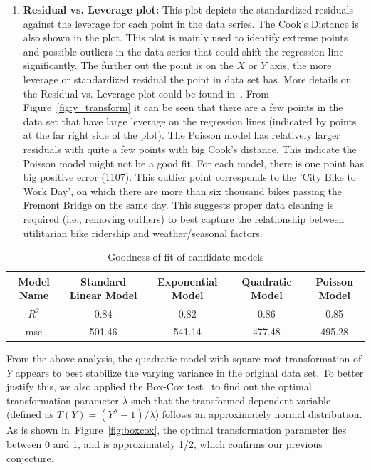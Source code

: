 \documentclass [11pt, proquest] {uwthesis}[2015/03/03]
\begin{document}
\begin{enumerate}
\item \textbf{Residual vs. Leverage plot:} This plot depicts the standardized residuals against the leverage for each point in the data series. The Cook's Distance is also shown in the plot. This plot is mainly used to identify extreme points and possible outliers in the data series that could shift the regression line significantly. The further out the point is on the $X$ or $Y$ axis, the more leverage or standardized residual the point in data set has. More details on the Residual vs. Leverage plot could be found in~\cite{gung13}. From Figure~\ref{fig:y_transform} it can be seen that there are a few points in the data set that have large leverage on the regression lines (indicated by points at the far right side of the plot). The Poisson model has relatively larger residuals with quite a few points with big Cook's distance. This indicate the Poisson model might not be a good fit. For each model, there is one point has big positive error (1107). This outlier point corresponds to the 'City Bike to Work Day', on which there are more than six thousand bikes passing the Fremont Bridge on the same day. This suggests proper data cleaning is required (i.e., removing outliers) to best capture the relationship between utilitarian bike ridership and weather/seasonal factors. 
\end{enumerate}

\begin{table}
\caption{Goodness-of-fit of candidate models} 
  \label{tbl:ytransform} 
\small
\begin{tabular}{ c | c | c | c | c } 
\hline 
  Model Name & Standard Linear Model & Exponential Model & Quadratic Model & Poisson Model \\ 
\hline
  $R^2$  & 0.84 & 0.82 & 0.86 & 0.85 \\ 
  mse  & 501.46 & 541.14 & 477.48 & 495.28 \\ 
\hline 
\end{tabular} 
\end{table} 

From the above analysis, the quadratic model with square root transformation of $Y$ appears to best stabilize the varying variance in the original data set. To better justify this, we also applied the Box-Cox test~\cite{boxcox64} to find out the optimal transformation parameter $\lambda$ such that the transformed dependent variable (defined as $T(Y) = (Y^{\lambda}-1)/\lambda$) follows an approximately normal distribution. As is shown in~Figure~\ref{fig:boxcox}, the optimal transformation parameter lies between 0 and 1, and is approximately 1/2, which confirms our previous conjecture.
\end{document}
